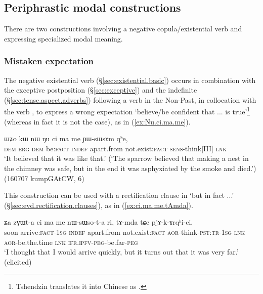 \subsection{Periphrastic modal constructions} \label{sec:cimame.cinAmaRkW}
There are two constructions involving a negative copula/existential verb and expressing specialized modal meaning.

\subsubsection{Mistaken expectation} \label{sec:cimame}
The negative existential verb   (§\ref{sec:existential.basic}) occurs in combination with the exceptive postposition  (§\ref{sec:exceptive}) and the indefinite  (§\ref{sec:tense.aspect.adverbs}) following a verb in the Non-Past, in collocation with the verb , to express a wrong expectation `believe/be confident that ... is true'\footnote{Tshendzin translates it into Chinese as . } (whereas in fact it is not the case), as in (\ref{ex:Nu.ci.ma.me}). 


\begin{exe}
	\ex \label{ex:Nu.ci.ma.me}
	\gll ɯʑo kɯ nɯ ŋu ci ma me ɲɯ-sɯsɤm qʰe,  \\
	\textsc{dem} \textsc{erg} \textsc{dem} be:\textsc{fact} \textsc{indef} apart.from  not.exist:\textsc{fact} \textsc{sens}-think[III] \textsc{lnk} \\
	\glt `It believed that it was like that.'  (`The sparrow believed that making a nest in the chimney was safe, but in the end it was asphyxiated by the smoke and died.') (160707 kumpGAtCW, 6)
\end{exe}

This construction can be used with a rectification clause in   `but in fact ...' (§\ref{sec:evd.rectification.clauses}), as in (\ref{ex:ci.ma.me.tAmda}).

\begin{exe}
	\ex \label{ex:ci.ma.me.tAmda}
	\gll ʑa zɣɯt-a ci ma me nɯ-sɯso-t-a ri, tɤ-mda tɕe pjɤ-k-ɤrqʰi-ci. \\
	soon arrive:\textsc{fact}-\textsc{1sg} \textsc{indef} apart.from not.exist:\textsc{fact} \textsc{aor}-think-\textsc{pst}:\textsc{tr}-\textsc{1sg} \textsc{lnk} 
	\textsc{aor}-be.the.time \textsc{lnk}  \textsc{ifr}.\textsc{ipfv}-\textsc{peg}-be.far-\textsc{peg} \\
	\glt `I thought that I would arrive quickly, but it turns out that it was very far.' (elicited)
\end{exe}


